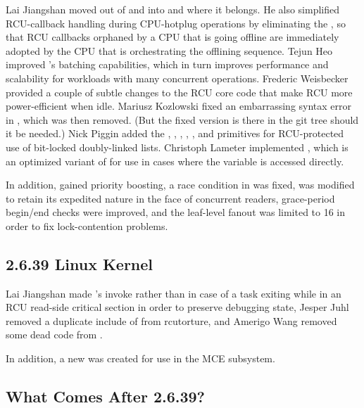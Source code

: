 Lai Jiangshan moved  out of
 and into  and
 where it belongs.
He also simplified RCU-callback handling during CPU-hotplug operations
by eliminating the , so that RCU callbacks
orphaned by a CPU that is going offline are immediately adopted by
the CPU that is orchestrating the offlining sequence.
Tejun Heo improved 's batching
capabilities, which in turn improves performance and scalability
for workloads with many concurrent 
operations.
Frederic Weisbecker provided a couple of subtle changes to the
RCU core code that make RCU more power-efficient when idle.
Mariusz Kozlowski fixed an embarrassing syntax error in
, which was then removed.
(But the fixed version is there in the git tree should it be needed.)
Nick Piggin added the ,
,
,
,
, and
 primitives for RCU-protected use
of bit-locked doubly-linked lists.
Christoph Lameter implemented , which is an
optimized variant of
 for use in cases where the variable is accessed directly.

In addition,  gained priority boosting, a race condition
in  was fixed,
 was modified to retain its expedited
nature in the face of concurrent readers,
grace-period begin/end checks were improved,
and the  leaf-level fanout was limited to 16 in order to fix
lock-contention problems.

\subsection{2.6.39 Linux Kernel}

Lai Jiangshan made 's  invoke
rather than  in case of a task exiting while
in an RCU read-side critical section in order to preserve debugging
state,
Jesper Juhl removed a duplicate include of  from
rcutorture,
and
Amerigo Wang removed some dead code from .

In addition, a new  was created for use in the
MCE subsystem.

\subsection{What Comes After 2.6.39?}

